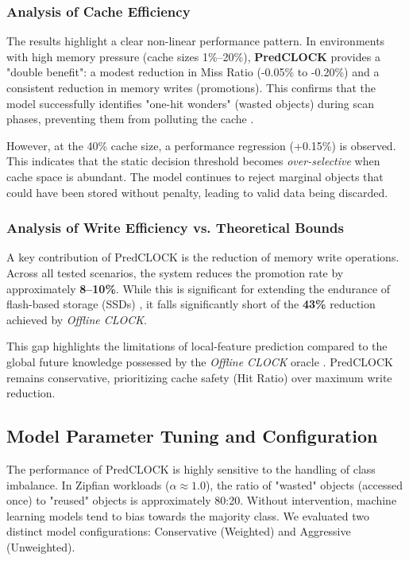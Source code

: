 \subsubsection{Analysis of Cache Efficiency}
The results highlight a clear non-linear performance pattern. In
environments with high memory pressure (cache sizes 1\%--20\%),
\textbf{PredCLOCK} provides a "double benefit": a modest reduction in
Miss Ratio (-0.05\% to -0.20\%) and a consistent reduction in memory
writes (promotions). This confirms that the model successfully
identifies "one-hit wonders" (wasted objects) during scan phases,
preventing them from polluting the cache \cite{Tang1976Cache, Breslau1999Web}.

However, at the 40\% cache size, a performance regression (+0.15\%)
is observed. This indicates that the static decision threshold
becomes \textit{over-selective} when cache space is abundant. The
model continues to reject marginal objects that could have been
stored without penalty, leading to valid data being discarded.

\subsubsection{Analysis of Write Efficiency vs. Theoretical Bounds}
A key contribution of PredCLOCK is the reduction of memory write
operations. Across all tested scenarios, the system reduces the
promotion rate by approximately \textbf{8--10\%}. While this is
significant for extending the endurance of flash-based storage (SSDs)
\cite{Sun2022NCache, Wang2018Efficient}, it falls significantly short
of the \textbf{43\%} reduction achieved by \textit{Offline CLOCK}.

This gap highlights the limitations of local-feature prediction
compared to the global future knowledge possessed by the
\textit{Offline CLOCK} oracle \cite{chen2025lazy}. PredCLOCK remains
conservative, prioritizing cache safety (Hit Ratio) over maximum
write reduction.

\subsection{Model Parameter Tuning and Configuration}
\label{sec:model_tuning}

The performance of PredCLOCK is highly sensitive to the handling of
class imbalance. In Zipfian workloads ($\alpha \approx 1.0$), the
ratio of "wasted" objects (accessed once) to "reused" objects is
approximately 80:20. Without intervention, machine learning models
tend to bias towards the majority class. We evaluated two distinct
model configurations: Conservative (Weighted) and Aggressive (Unweighted).

